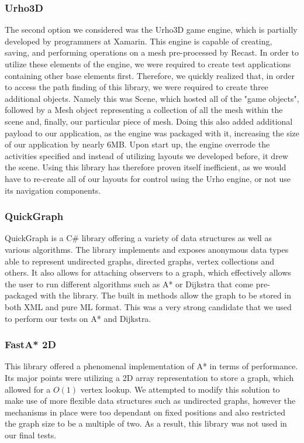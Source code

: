 \documentclass[12pt,a4paper]{report}
\begin{document}
\subsubsection{Urho3D}
The second option we considered was the Urho3D game engine, which is partially developed by programmers at Xamarin. This engine\cite{libUrho} is capable of creating, saving, and performing operations on a mesh pre-processed by Recast. In order to utilize these elements of the engine, we were required to create test applications containing other base elements first. Therefore, we quickly realized that, in order to access the path finding of this library, we were required to create three additional objects. Namely this was Scene, which hosted all of the "game objects", followed by a Mesh object representing a collection of all the mesh within the scene and, finally, our particular piece of mesh. Doing this also added additional payload to our application, as the engine was packaged with it, increasing the size of our application by nearly 6MB. Upon start up, the engine overrode the activities specified and instead of utilizing layouts we developed before, it drew the scene. Using this library has therefore proven itself inefficient, as we would have to re-create all of our layouts for control using the Urho engine, or not use its navigation components.

\subsubsection{QuickGraph}
QuickGraph\cite{libQuickgraph} is a C\# library offering a variety of data structures as well as various algorithms. The library implements and exposes anonymous data types able to represent undirected graphs, directed graphs, vertex collections and others. It also allows for attaching observers to a graph, which effectively allows the user to run different algorithms such as A* or Dijkstra that come pre-packaged with the library. The built in methods allow the graph to be stored in both XML and pure ML format. This was a very strong candidate that we used to perform our tests on A* and Dijkstra.

\subsubsection{FastA* 2D}
This library\cite{libFastA} offered a phenomenal implementation of A* in terms of performance. Its major points were utilizing a 2D array representation to store a graph, which allowed for a $O(1)$ vertex lookup. We attempted to modify this solution to make use of more flexible data structures such as undirected graphs, however the mechanisms in place were too dependant on fixed positions and also restricted the graph size to be a multiple of two. As a result, this library was not used in our final tests.
\end{document}
